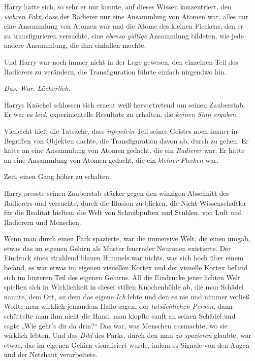 {Harry hatte sich, so sehr er nur konnte, auf dieses Wissen konzentriert, den \emph{wahren Fakt,} dass der Radierer nur eine Ansammlung von Atomen war, alles nur eine Ansammlung von Atomen war und die Atome des kleinen Fleckens, den er zu transfigurieren versuchte, eine \emph{ebenso gültige} Ansammlung bildeten, wie jede andere Ansammlung, die ihm einfallen mochte.

Und Harry war noch immer nicht in der Lage gewesen, den einzelnen Teil des Radierers zu verändern, die Transfiguration führte einfach nirgendwo hin.

\emph{Das. War. Lächerlich.}

Harrys Knöchel schlossen sich erneut weiß hervortretend um seinen Zauberstab. Er war es \emph{leid,} experimentelle Resultate zu erhalten, die \emph{keinen Sinn ergaben.}

Vielleicht hielt die Tatsache, dass \emph{irgendein} Teil seines Geistes noch immer in Begriffen von Objekten dachte, die Transfiguration davon ab, durch zu gehen. Er hatte an eine Ansammlung von Atomen gedacht, die ein \emph{Radierer} war. Er hatte an eine Ansammlung von Atomen gedacht, die ein \emph{kleiner Flecken} war.

Zeit, einen Gang höher zu schalten.

Harry presste seinen Zauberstab stärker gegen den winzigen Abschnitt des Radierers und versuchte, durch die Illusion zu blicken, die Nicht-Wissenschaftler für die Realität hielten, die Welt von Schreibpulten und Stühlen, von Luft und Radierern und Menschen.

Wenn man durch einen Park spazierte, war die immersive Welt, die einen umgab, etwas das im eigenen Gehirn als Muster feuernder Neuronen existierte. Der Eindruck eines strahlend blauen Himmels war nichts, was sich hoch über einem befand, es war etwas im eigenen visuellen Kortex und der visuelle Kortex befand sich im hinteren Teil des eigenen Gehirns. All die Eindrücke jener lichten Welt spielten sich in Wirklichkeit in dieser stillen Knochenhöhle ab, die man Schädel nannte, dem Ort, an dem das eigene \emph{Ich} lebte und den es nie und nimmer verließ. Wollte man wirklich jemandem Hallo sagen, der \emph{tatsächlichen Person,} dann schüttelte man ihm nicht die Hand, man klopfte sanft an seinen Schädel und sagte „Wie geht's dir da drin?“ Das war, was Menschen ausmachte, wo sie wirklich lebten. Und das \emph{Bild} des Parks, durch den man \emph{zu spazieren} glaubte, war etwas, das im eigenen Gehirn visualisiert wurde, indem es Signale von den Augen und der Netzhaut verarbeitete.

}
